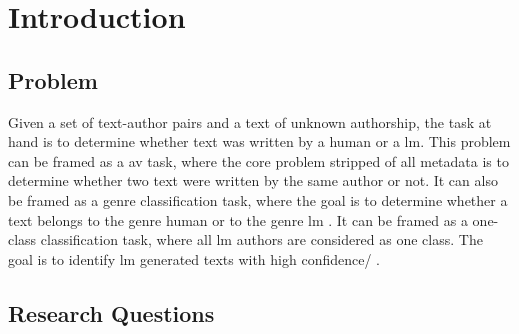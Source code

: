 \chapter{Introduction}
\label{chap:introduction}

\section{Problem}
\label{sec:problem}

Given a set of text-author pairs and a text of unknown authorship, 
the task at hand is to determine whether text was written by a human or a \ac{lm}.
This problem can be framed as a \ac{av} task, where the core problem stripped of all metadata 
is to determine whether two text were written by the same author or not.
It can also be framed as a genre classification task, where the goal is to determine whether a text belongs 
to the genre human or to the genre \ac{lm} .
It can be framed as a one-class classification task, where all \ac{lm} authors are considered as one class.
The goal is to identify \ac{lm} generated texts with high confidence/ .



\section{Research Questions}
\label{sec:research_questions}

